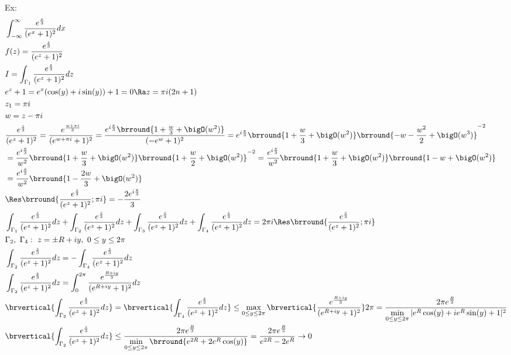 Ex:
\begin{align*}
    &\int_{-\infty}^\infty\frac{e^{\frac{x}{3}}}{(e^x+1)^2}dx\\
    &f(z)=\frac{e^{\frac{z}{3}}}{(e^z+1)^2}\\
    &I=\int_{\Gamma_1}\frac{e^{\frac{z}{3}}}{(e^z+1)^2}dz\\
    &e^z+1=e^x(\cos(y)+i\sin(y))+1=0\Ra z=\pi i(2n+1)\\
    &z_1=\pi i\\
    &w=z-\pi i\\
    &\frac{e^{\frac{z}{3}}}{(e^z+1)^2}=\frac{e^{\frac{w+\pi i}{3}}}{(e^{w+\pi i}+1)^2}=\frac{e^{i\frac{\pi}{3}}\brround{1+\frac{w}{3}+\bigO(w^2)}}{(-e^w+1)^2}=e^{i\frac{\pi}{3}}\brround{1+\frac{w}{3}+\bigO(w^2)}\brround{-w-\frac{w^2}{2}+\bigO(w^3)}^{-2}\\
    &=\frac{e^{i\frac{\pi}{3}}}{w^2}\brround{1+\frac{w}{3}+\bigO(w^2)}\brround{1+\frac{w}{2}+\bigO(w^2)}^{-2}=\frac{e^{i\frac{\pi}{3}}}{w^2}\brround{1+\frac{w}{3}+\bigO(w^2)}\brround{1-w+\bigO(w^2)}\\
    &=\frac{e^{i\frac{\pi}{3}}}{w^2}\brround{1-\frac{2w}{3}+\bigO(w^2)}\\
    &\Res\brround{\frac{e^{\frac{z}{3}}}{(e^z+1)^2};\pi i}=-\frac{2e^{i\frac{\pi}{3}}}{3}\\
    &\int_{\Gamma_1}\frac{e^{\frac{z}{3}}}{(e^z+1)^2}dz+\int_{\Gamma_2}\frac{e^{\frac{z}{3}}}{(e^z+1)^2}dz+\int_{\Gamma_3}\frac{e^{\frac{z}{3}}}{(e^z+1)^2}dz+\int_{\Gamma_4}\frac{e^{\frac{z}{3}}}{(e^z+1)^2}dz=2\pi i\Res\brround{\frac{e^{\frac{z}{3}}}{(e^z+1)^2};\pi i}\\
    &\Gamma_2,\ \Gamma_4:\ z=\pm R+iy,\ 0\leq y\leq 2\pi\\
    &\int_{\Gamma_2}\frac{e^{\frac{z}{3}}}{(e^z+1)^2}dz=-\int_{\Gamma_4}\frac{e^{\frac{z}{3}}}{(e^z+1)^2}dz\\
    &\int_{\Gamma_2}\frac{e^{\frac{z}{3}}}{(e^z+1)^2}dz=\int_0^{2\pi}\frac{e^{\frac{ R+iy}{3}}}{(e^{R+iy}+1)^2}dz\\
    &\brvertical{\int_{\Gamma_2}\frac{e^{\frac{z}{3}}}{(e^z+1)^2}dz}=\brvertical{\int_{\Gamma_4}\frac{e^{\frac{z}{3}}}{(e^z+1)^2}dz}\leq\max_{0\leq y\leq 2\pi}\brvertical{\frac{e^{\frac{R+iy}{3}}}{(e^{R+iy}+1)^2}}2\pi=\frac{2\pi e^{\frac{R}{3}}}{\min\limits_{0\leq y\leq 2\pi}|e^R\cos(y)+ie^R\sin(y)+1|^2}\\
    &\brvertical{\int_{\Gamma_2}\frac{e^{\frac{z}{3}}}{(e^z+1)^2}dz}\leq\frac{2\pi e^{\frac{R}{3}}}{\min\limits_{0\leq y\leq 2\pi}\brround{e^{2R}+2e^R\cos(y)}}=\frac{2\pi e^{\frac{R}{3}}}{e^{2R}-2e^{R}}\to 0\\

\end{align*}
